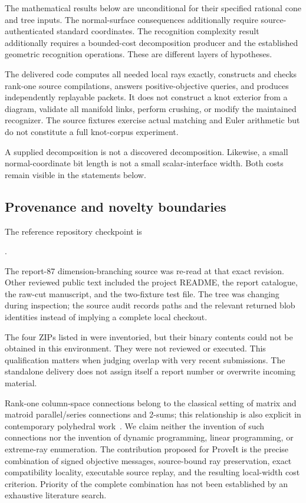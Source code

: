 The mathematical results below are unconditional for their specified rational
cone and tree inputs. The normal-surface consequences additionally require
source-authenticated standard coordinates. The recognition complexity result
additionally requires a bounded-cost decomposition producer and the established
geometric recognition operations. These are different layers of hypotheses.

The delivered code computes all needed local rays exactly, constructs and
checks rank-one source compilations, answers positive-objective queries, and
produces independently replayable packets. It does not construct a knot exterior
from a diagram, validate all manifold links, perform crushing, or modify the
maintained recognizer. The source fixtures exercise actual matching and Euler
arithmetic but do not constitute a full knot-corpus experiment.

A supplied decomposition is not a discovered decomposition. Likewise, a small
normal-coordinate bit length is not a small scalar-interface width. Both costs
remain visible in the statements below.

\subsection{Provenance and novelty boundaries}

The reference repository checkpoint is
\begin{center}\small{}.\end{center}
The report-87 dimension-branching source was re-read at that exact revision.
Other reviewed public text included the project README, the report catalogue,
the raw-cut manuscript, and the two-fixture test file. The tree was changing
during inspection; the source audit records paths and the relevant returned
blob identities instead of implying a complete local checkout.

The four ZIPs listed in  were inventoried, but their binary
contents could not be obtained in this environment. They were not reviewed or
executed. This qualification matters when judging overlap with very recent
submissions. The standalone delivery does not assign itself a report number
or overwrite incoming material.

Rank-one column-space connections belong to the classical setting of matrix
and matroid parallel/series connections and 2-sums; this relationship is also
explicit in contemporary polyhedral work~\cite{connections}. We claim neither
the invention of such connections nor the invention of dynamic programming,
linear programming, or extreme-ray enumeration. The contribution proposed for
ProveIt is the precise combination of signed objective messages, source-bound
ray preservation, exact compatibility locality, executable source replay, and
the resulting local-width cost criterion. Priority of the complete combination
has not been established by an exhaustive literature search.

